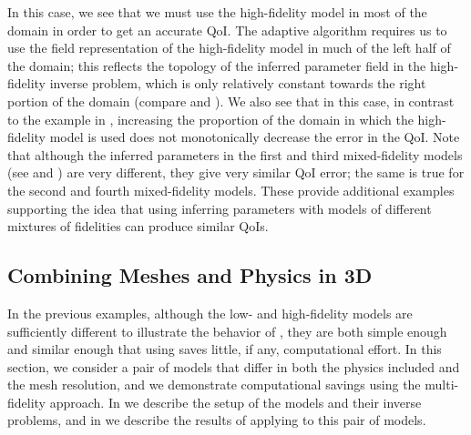 In this case, we see that we must use the high-fidelity model in most of the domain in order to get an accurate QoI. The adaptive algorithm requires us to use the field representation of the high-fidelity model in much of the left half of the domain; this reflects the topology of the inferred parameter field in the high-fidelity inverse problem, which is only relatively constant towards the right portion of the domain (compare  and ). We also see that in this case, in contrast to the example in , increasing the proportion of the domain in which the high-fidelity model is used does not monotonically decrease the error in the QoI. Note that although the inferred parameters in the first and third mixed-fidelity models (see  and ) are very different, they give very similar QoI error; the same is true for the second and fourth mixed-fidelity models. These provide additional examples supporting the idea that using inferring parameters with models of different mixtures of fidelities can produce similar QoIs.


\subsection{Combining Meshes and Physics in 3D} \label{sec:diffvcdr3D}

In the previous examples, although the low- and high-fidelity models are sufficiently different to illustrate the behavior of , they are both simple enough and similar enough that using  saves little, if any, computational effort. In this section, we consider a pair of models that differ in both the physics included and the mesh resolution, and we demonstrate computational savings using the multi-fidelity approach. In  we describe the setup of the models and their inverse problems, and in  we describe the results of applying  to this pair of models.

